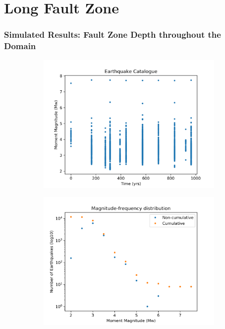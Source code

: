 \documentclass{beamer}
\begin{document}
\section{Long Fault Zone}
\begin{frame}
    \frametitle{Simulated Results: Fault Zone Depth throughout the Domain}
    \begin{figure}
        \begin{subfigure}[b]{0.5\textwidth}
            \includegraphics[width=\textwidth]{images/resultlongFZ/catalogue} 
        \end{subfigure}%
        \begin{subfigure}[b]{0.5\textwidth}
            \includegraphics[width=\textwidth]{images/resultlongFZ/mfd}
        \end{subfigure}%
    \end{figure}

\end{frame}
\end{document}
